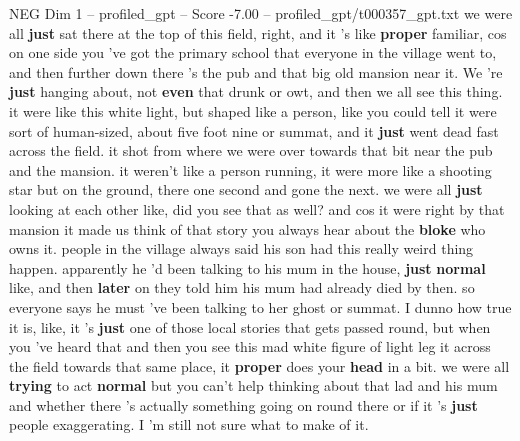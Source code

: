 \begin{textsample}{NEG Dim 1 – profiled\_gpt – Score -7.00 – profiled\_gpt/t000357\_gpt.txt}  \label{ex:f1_neg_012}
we were all \textbf{just} sat there at the top of this field, right, and it ’s like \textbf{proper} familiar, cos on one side you ’ve got the primary school that everyone in the village went to, and then further down there ’s the pub and that big old mansion near it.
We ’re \textbf{just} hanging about, not \textbf{even} that drunk or owt, and then we all see this thing. it were like this white light, but shaped like a person, like you could tell it were sort of human-sized, about five foot nine or summat, and it \textbf{just} went dead fast across the field. it shot from where we were over towards that bit near the pub and the mansion. it weren't like a person running, it were more like a shooting star but on the ground, there one second and gone the next. we were all \textbf{just} looking at each other like, did you see that as well? and cos it were right by that mansion it made us think of that story you always hear about the \textbf{bloke} who owns it. people in the village always said his son had this really weird thing happen. apparently he ’d been talking to his mum in the house, \textbf{just} \textbf{normal} like, and then \textbf{later} on they told him his mum had already died by then. so everyone says he must ’ve been talking to her ghost or summat.
I dunno how true it is, like, it ’s \textbf{just} one of those local stories that gets passed round, but when you ’ve heard that and then you see this mad white figure of light leg it across the field towards that same place, it \textbf{proper} does your \textbf{head} in a bit. we were all \textbf{trying} to act \textbf{normal} but you can't help thinking about that lad and his mum and whether there ’s actually something going on round there or if it ’s \textbf{just} people exaggerating.
I ’m still not sure what to make of it.

\end{textsample}
